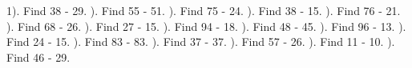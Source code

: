 \documentclass{article}%
\begin{document}
1). Find 38 {-} 29.%
\newline%
\newline%
). Find 55 {-} 51.%
\newline%
\newline%
). Find 75 {-} 24.%
\newline%
\newline%
). Find 38 {-} 15.%
\newline%
\newline%
). Find 76 {-} 21.%
\newline%
\newline%
). Find 68 {-} 26.%
\newline%
\newline%
). Find 27 {-} 15.%
\newline%
\newline%
). Find 94 {-} 18.%
\newline%
\newline%
). Find 48 {-} 45.%
\newline%
\newline%
). Find 96 {-} 13.%
\newline%
\newline%
). Find 24 {-} 15.%
\newline%
\newline%
). Find 83 {-} 83.%
\newline%
\newline%
). Find 37 {-} 37.%
\newline%
\newline%
). Find 57 {-} 26.%
\newline%
\newline%
). Find 11 {-} 10.%
\newline%
\newline%
). Find 46 {-} 29.%
\newline%
\end{document}
